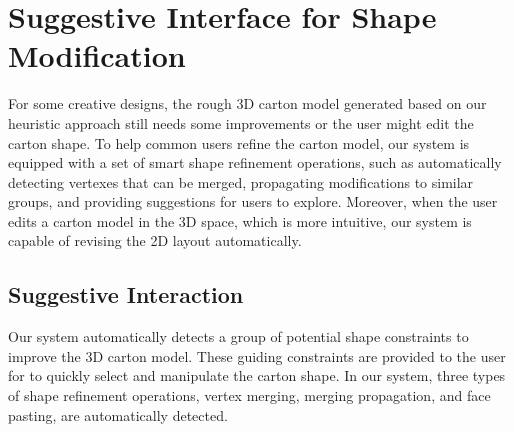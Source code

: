 \section{Suggestive Interface for Shape Modification }\label{sec:interaction}
%
For some creative designs, the rough 3D carton model generated based on our heuristic approach still needs some improvements or the user might edit the carton shape. 
To help common users refine the carton model, our system is equipped with a set of smart shape refinement operations, such as automatically detecting vertexes that can be merged, propagating modifications to similar groups, and providing suggestions for users to explore. 
%
Moreover, when the user edits a carton model in the 3D space, which is more intuitive, our system is capable of revising the 2D layout automatically. 

 
\subsection{Suggestive Interaction}

Our system automatically detects a group of potential shape constraints to improve the 3D carton model. 
These guiding constraints are provided to the user for to quickly select and manipulate the carton shape.
In our system, three types of shape refinement operations, vertex merging, merging propagation, and face pasting, are automatically detected.


